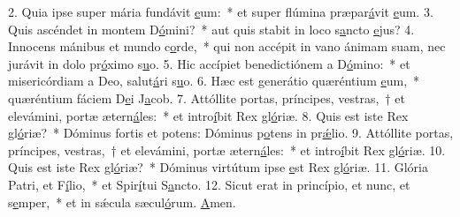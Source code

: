 2. Quia ipse super mária fundávit \uline{e}um:~* et super flúmina præpar\uline{á}vit \uline{e}um.
3. Quis ascéndet in montem D\uline{ó}mini?~* aut quis stabit in loco s\uline{a}ncto \uline{e}jus?
4. Innocens mánibus et mundo c\uline{o}rde,~* qui non accépit in vano ánimam suam, nec jurávit in dolo pr\uline{ó}ximo s\uline{u}o.
5. Hic accípiet benedictiónem a D\uline{ó}mino:~* et misericórdiam a Deo, salut\uline{á}ri s\uline{u}o.
6. Hæc est generátio quæréntium \uline{e}um,~* quæréntium fáciem D\uline{e}i J\uline{a}cob.
7. Attóllite portas, príncipes, vestras,~† et elevámini, portæ ætern\uline{á}les:~* et intro\uline{í}bit Rex gl\uline{ó}riæ.
8. Quis est iste Rex gl\uline{ó}riæ?~* Dóminus fortis et potens: Dóminus p\uline{o}tens in pr\uline{ǽ}lio.
9. Attóllite portas, príncipes, vestras,~† et elevámini, portæ ætern\uline{á}les:~* et intro\uline{í}bit Rex gl\uline{ó}riæ.
10. Quis est iste Rex gl\uline{ó}riæ?~* Dóminus virtútum ipse \uline{e}st Rex gl\uline{ó}riæ.
11. Glória Patri, et F\uline{í}lio,~* et Spir\uline{í}tui S\uline{a}ncto.
12. Sicut erat in princípio, et nunc, et s\uline{e}mper,~* et in sǽcula sæcul\uline{ó}rum. \uline{A}men.
